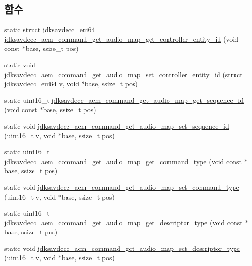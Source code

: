 \subsection*{함수}
\begin{DoxyCompactItemize}
\item 
static struct \hyperlink{structjdksavdecc__eui64}{jdksavdecc\+\_\+eui64} \hyperlink{group__command__get__audio__map_ga683998f3d1c9ff2ca10e0d5d5d42a1c9}{jdksavdecc\+\_\+aem\+\_\+command\+\_\+get\+\_\+audio\+\_\+map\+\_\+get\+\_\+controller\+\_\+entity\+\_\+id} (void const $\ast$base, ssize\+\_\+t pos)
\item 
static void \hyperlink{group__command__get__audio__map_ga10d402c6058dd33a5e44be6e9d3d0fe7}{jdksavdecc\+\_\+aem\+\_\+command\+\_\+get\+\_\+audio\+\_\+map\+\_\+set\+\_\+controller\+\_\+entity\+\_\+id} (struct \hyperlink{structjdksavdecc__eui64}{jdksavdecc\+\_\+eui64} v, void $\ast$base, ssize\+\_\+t pos)
\item 
static uint16\+\_\+t \hyperlink{group__command__get__audio__map_ga5f67df059314a36f067a4a88fcb5b904}{jdksavdecc\+\_\+aem\+\_\+command\+\_\+get\+\_\+audio\+\_\+map\+\_\+get\+\_\+sequence\+\_\+id} (void const $\ast$base, ssize\+\_\+t pos)
\item 
static void \hyperlink{group__command__get__audio__map_gae34218872f40ae0bd3d3ce5a58f111f0}{jdksavdecc\+\_\+aem\+\_\+command\+\_\+get\+\_\+audio\+\_\+map\+\_\+set\+\_\+sequence\+\_\+id} (uint16\+\_\+t v, void $\ast$base, ssize\+\_\+t pos)
\item 
static uint16\+\_\+t \hyperlink{group__command__get__audio__map_gaeb76bb49a80c60d51dbc28d2bf0848f6}{jdksavdecc\+\_\+aem\+\_\+command\+\_\+get\+\_\+audio\+\_\+map\+\_\+get\+\_\+command\+\_\+type} (void const $\ast$base, ssize\+\_\+t pos)
\item 
static void \hyperlink{group__command__get__audio__map_ga2358cd9408c64152a8eeba3b39452daa}{jdksavdecc\+\_\+aem\+\_\+command\+\_\+get\+\_\+audio\+\_\+map\+\_\+set\+\_\+command\+\_\+type} (uint16\+\_\+t v, void $\ast$base, ssize\+\_\+t pos)
\item 
static uint16\+\_\+t \hyperlink{group__command__get__audio__map_gaffddbc426fe3b47801bf90ce6866ea4d}{jdksavdecc\+\_\+aem\+\_\+command\+\_\+get\+\_\+audio\+\_\+map\+\_\+get\+\_\+descriptor\+\_\+type} (void const $\ast$base, ssize\+\_\+t pos)
\item 
static void \hyperlink{group__command__get__audio__map_ga8ab8884a6cc2320d43da05a5c24c8bb4}{jdksavdecc\+\_\+aem\+\_\+command\+\_\+get\+\_\+audio\+\_\+map\+\_\+set\+\_\+descriptor\+\_\+type} (uint16\+\_\+t v, void $\ast$base, ssize\+\_\+t pos)

\end{DoxyCompactItemize}
